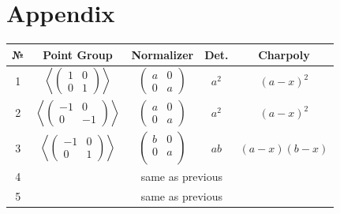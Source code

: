 \documentclass[a4paper,12pt]{amsart}
\begin{document}
	
	\newpage
	\section{Appendix}
	
	
	\begin{table}[h]
		\begin{tabular}{|c|c|c|c|c|}
			\hline
			
			
			№ & \textbf{Point Group} &  \textbf{Normalizer} & \textbf{Det.} & \textbf{Charpoly} \\ 
			\hline
			
			
			1  & $\left\langle 
					\begin{pmatrix}
						1 & 0 \\ 
						0 & 1 
					\end{pmatrix}
				\right\rangle$			 
			   & $\begin{pmatrix}
			   	a & 0 \\ 
			   	0 & a 
			   \end{pmatrix}$ 
		   		& $a^2$ &  $(a - x)^2$   \\
			   
			2 & $\left\langle 
			\begin{pmatrix}
				-1 & 0 \\ 
				0 & -1 
			\end{pmatrix}
			\right\rangle$			 
			& $\begin{pmatrix}
				a & 0 \\ 
				0 & a 
			\end{pmatrix}$ 
			& $a^2$ &  $(a - x)^2$   \\ 
			  
			3 & $\left\langle 
				\begin{pmatrix}
					-1 & 0 \\ 
					0 & 1 
				\end{pmatrix}
				\right\rangle$ 
			
			  & $
			  	\begin{pmatrix}
				  b & 0 \\    
				  0 & a \\
				  
		  	   	\end{pmatrix}
			  $ 
			  
			  
			  & $ab$ & $(a - x)(b - x)$  \\ 
			 
			\hline
			4 & \multicolumn{4}{|c|}{same as previous} \\ 
			\hline
			5 & \multicolumn{4}{|c|}{same as previous} \\ 
			\hline
			

\end{tabular}
\end{table}
\end{document}
